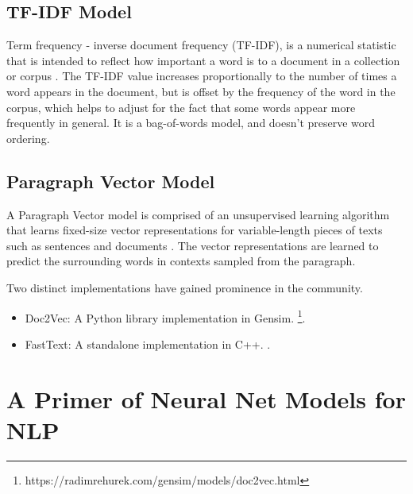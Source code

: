 \documentclass[11pt,a4paper]{article}
\begin{document}

  \subsection{TF-IDF Model} %
  \label{sub:tf_idf_model}
    Term frequency - inverse document frequency (TF-IDF), is a numerical statistic that is intended to reflect how important a word is to a document in a collection or corpus \cite{sparck1972statistical}. The TF-IDF value increases proportionally to the number of times a word appears in the document, but is offset by the frequency of the word in the corpus, which helps to adjust for the fact that some words appear more frequently in general. It is a bag-of-words model, and doesn't preserve word ordering.


  \subsection{Paragraph Vector Model} %
  \label{sub:paragraph_vectors_doc2vec}

    A Paragraph Vector model is comprised of an unsupervised learning algorithm that learns fixed-size vector representations for variable-length pieces of texts such as sentences and documents \cite{le2014distributed}. The vector representations are learned to predict the surrounding words in contexts sampled from the paragraph. 

    Two distinct implementations have gained prominence in the community.
    \begin{itemize}
      \item
        Doc2Vec: A Python library implementation in Gensim. \footnote{https://radimrehurek.com/gensim/models/doc2vec.html}.
      \item
        FastText: A standalone implementation in C++. \cite{bojanowski2016enriching} \cite{joulin2016bag}.
    \end{itemize}




\section{A Primer of Neural Net Models for NLP\cite{goldberg2016primer}} %
\label{sec:a_primer_of_neural_net_models_for_nlp}
\end{document}
